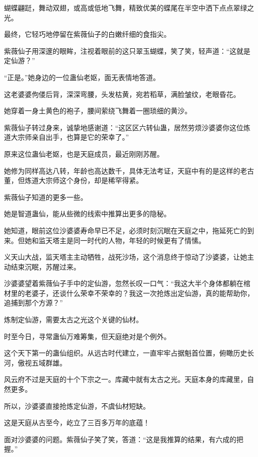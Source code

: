 
\begin{this_body}

蝴蝶翩跹，舞动双翅，或高或低地飞舞，精致优美的蝶尾在半空中洒下点点翠绿之光。

最终，它轻巧地停留在紫薇仙子的白嫩纤细的食指尖。

紫薇仙子用深邃的眼眸，注视着眼前的这只翠玉蝴蝶，笑了笑，轻声道：“这就是定仙游？”

“正是。”她身边的一位蛊仙老妪，面无表情地答道。

这老婆婆佝偻后背，深深弯腰，头发枯黄，宛若稻草，满脸皱纹，老眼昏花。

她穿着一身土黄色的袍子，腰间萦绕飞舞着一圈琐细的黄沙。

紫薇仙子转过身来，诚挚地感谢道：“这区区六转仙蛊，居然劳烦沙婆婆你这位炼道大宗师亲自出手，也算是它的荣幸了。”

原来这位蛊仙老妪，也是天庭成员，最近刚刚苏醒。

她修为同样高达八转，年龄也高达数千，具体无法考证，天庭中有的是这样的老古董，但炼道大宗师这个身份，却是稀罕得紧。

紫薇仙子知道的更多一些。

她是智道蛊仙，能从些微的线索中推算出更多的隐秘。

她知道，眼前这位沙婆婆寿命早已不足，必须时刻沉眠在天庭之中，拖延死亡的到来。但她和监天塔主是同一时代的人物，年轻的时候更有了情愫。

义天山大战，监天塔主主动牺牲，战死沙场，这个消息终于惊动了沙婆婆，让她主动结束沉眠，苏醒过来。

沙婆婆望着紫薇仙子手中的定仙游，忽然长叹一口气：“我这大半个身体都躺在棺材里的老婆子，还谈什么荣幸不荣幸的？我这一次抢炼出定仙游，真的能帮助你，追捕到那个方源？”

炼制定仙游，需要太古之光这个关键的仙材。

时至今日，寻常蛊仙万难筹集，但天庭绝对是个例外。

这个天下第一的蛊仙组织。从远古时代建立，一直牢牢占据魁首位置，俯瞰历史长河，傲视五域群雄。

风云府不过是天庭的十个下宗之一。库藏中就有太古之光。天庭本身的库藏里，自然更多。

所以，沙婆婆直接抢炼定仙游，不虞仙材短缺。

这是天庭从古至今，屹立了三百多万年的底蕴！

面对沙婆婆的问题。紫薇仙子笑了笑，答道：“这是我推算的结果，有六成的把握。”


\end{this_body}
